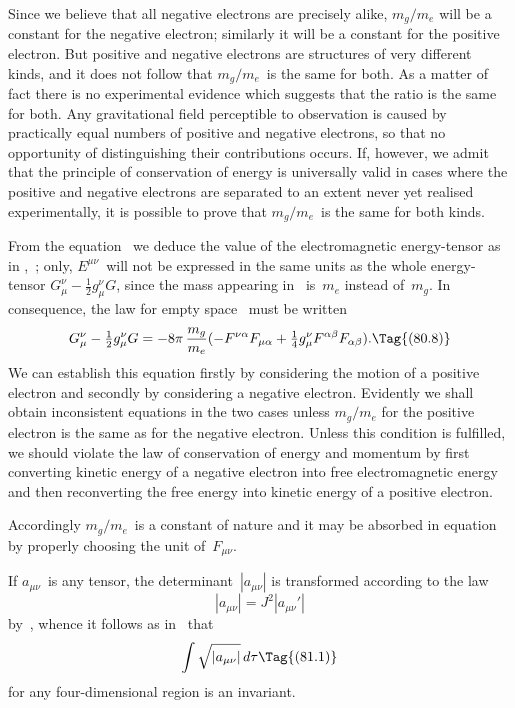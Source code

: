 \documentclass[12pt]{book}
\begin{document}
Since we believe that all negative electrons are precisely alike, $m_{g}/m_{e}$ will
be a constant for the negative electron; similarly it will be a constant for the
positive electron. But positive and negative electrons are structures of very
different kinds, and it does not follow that $m_{g}/m_{e}$~is the same for both. As a
matter of fact there is no experimental evidence which suggests that the ratio
is the same for both. Any gravitational field perceptible to observation is
caused by practically equal numbers of positive and negative electrons, so that
no opportunity of distinguishing their contributions occurs. If, however, we
admit that the principle of conservation of energy is universally valid in cases
where the positive and negative electrons are separated to an extent never
yet realised experimentally, it is possible to prove that $m_{g}/m_{e}$~is the same for
both kinds.

From the equation~ we deduce the value of the electromagnetic
energy-tensor as in ,~; only, $E^{\mu\nu}$~will not be expressed in the same
units as the whole energy-tensor $G_{\mu}^{\nu} - \frac{1}{2} g_{\mu}^{\nu} G$, since the mass appearing in~
is~$m_{e}$ instead of~$m_{g}$. In consequence, the law for empty space~ must be
written
\[
G_{\mu}^{\nu} - \tfrac{1}{2} g_{\mu}^{\nu} G
= -8\pi\, \frac{m_{g}}{m_{e}} (-F^{\nu\alpha} F_{\mu\alpha} + \tfrac{1}{4}g_{\mu}^{\nu} F^{\alpha\beta} F_{\alpha\beta}).
\Tag{(80.8)}
\]
We can establish this equation firstly by considering the motion of a positive
electron and secondly by considering a negative electron. Evidently we shall
obtain inconsistent equations in the two cases unless $m_{g}/m_{e}$ for the positive
electron is the same as for the negative electron. Unless this condition is fulfilled,
we should violate the law of conservation of energy and momentum by
first converting kinetic energy of a negative electron into free electromagnetic
energy and then reconverting the free energy into kinetic energy of a positive
electron.

Accordingly $m_{g}/m_{e}$~is a constant of nature and it may be absorbed in
equation~ by properly choosing the unit of~$F_{\mu\nu}$.


If $a_{\mu\nu}$~is any tensor, the determinant~$|a_{\mu\nu}|$ is transformed according to the
law
\[
|a_{\mu\nu}| = J^{2} |a_{\mu\nu}'|
\]
by~, whence it follows as in~ that
\[
\int \sqrt{|a_{\mu\nu}|}\, d\tau
\Tag{(81.1)}
\]
for any four-dimensional region is an invariant.
\end{document}
